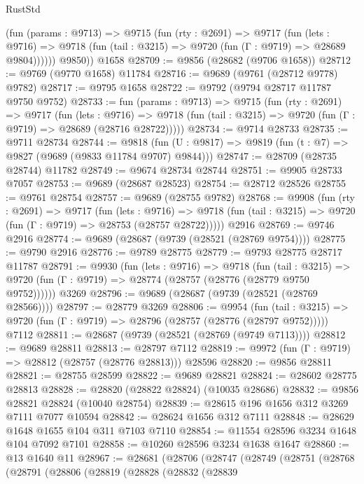 \begin{lexlean}{RustStd}
\begin{coremodule}
          (fun (params : @9713) =>
          @9715
            (fun (rty : @2691) =>
            @9717
              (fun (lets : @9716) =>
              @9718 (fun (tail : @3215) => @9720 (fun (Γ : @9719) => @28689 @9804))))))
        @9850))
    @1658
@28709 := @9856 (@28682 (@9706 @1658))
@28712 := @9769 (@9770 @1658) @11784
@28716 := @9689 (@9761 (@28712 @9778) @9782)
@28717 := @9795 @1658
@28722 := @9792 (@9794 @28717 @11787 @9750 @9752)
@28733 := fun (params : @9713) =>
  @9715
    (fun (rty : @2691) =>
    @9717
      (fun (lets : @9716) =>
      @9718 (fun (tail : @3215) => @9720 (fun (Γ : @9719) => @28689 (@28716 @28722)))))
@28734 := @9714 @28733
@28735 := @9711 @28734
@28744 := @9818
    (fun (U : @9817) => @9819 (fun (t : @7) => @9827 (@9689 (@9833 @11784 @9707) @9844)))
@28747 := @28709 (@28735 @28744) @11782
@28749 := @9674 @28734 @28744
@28751 := @9905 @28733 @7057
@28753 := @9689 (@28687 @28523)
@28754 := @28712 @28526
@28755 := @9761 @28754
@28757 := @9689 (@28755 @9782)
@28768 := @9908
    (fun (rty : @2691) =>
    @9717
      (fun (lets : @9716) =>
      @9718 (fun (tail : @3215) => @9720 (fun (Γ : @9719) => @28753 (@28757 @28722)))))
    @2916
@28769 := @9746 @2916
@28774 := @9689 (@28687 (@9739 (@28521 (@28769 @9754))))
@28775 := @9790 @2916
@28776 := @9789 @28775
@28779 := @9793 @28775 @28717 @11787
@28791 := @9930
    (fun (lets : @9716) =>
    @9718
      (fun (tail : @3215) =>
      @9720 (fun (Γ : @9719) => @28774 (@28757 (@28776 (@28779 @9750 @9752))))))
    @3269
@28796 := @9689 (@28687 (@9739 (@28521 (@28769 @28566))))
@28797 := @28779 @3269
@28806 := @9954
    (fun (tail : @3215) => @9720 (fun (Γ : @9719) => @28796 (@28757 (@28776 (@28797 @9752)))))
    @7112
@28811 := @28687 (@9739 (@28521 (@28769 (@9749 @7113))))
@28812 := @9689 @28811
@28813 := @28797 @7112
@28819 := @9972 (fun (Γ : @9719) => @28812 (@28757 (@28776 @28813))) @28596
@28820 := @9856 @28811
@28821 := @28755 @28599
@28822 := @9689 @28821
@28824 := @28602 @28775 @28813
@28828 := @28820 (@28822 @28824) (@10035 @28686)
@28832 := @9856 @28821 @28824 (@10040 @28754)
@28839 := @28615 @196 @1656 @312 @3269 @7111 @7077 @10594
@28842 := @28624 @1656 @312 @7111
@28848 := @28629 @1648 @1655 @104 @311 @7103 @7110
@28854 := @11554 @28596 @3234 @1648 @104 @7092 @7101
@28858 := @10260 @28596 @3234 @1638 @1647
@28860 := @13 @1640 @11
@28967 := @28681
    (@28706
      (@28747
        (@28749
          (@28751
            (@28768
              (@28791
                (@28806
                  (@28819
                    (@28828
                      (@28832
                        (@28839

\end{coremodule}
\end{lexlean}

